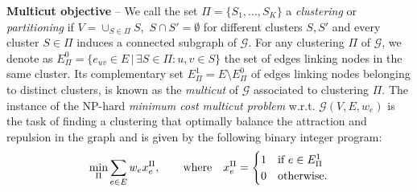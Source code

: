 \textbf{Multicut objective} -- We call the set $\Pi=\{S_1,\ldots,S_K\}$ a \emph{clustering} or \emph{partitioning} if $V = \cup_{S\in\Pi} S $, $\,S \cap S' = \emptyset$ for different clusters $S, S'$ and every cluster $S \in \Pi$ induces a connected subgraph of $\mathcal{G}$. 
For any clustering $\Pi$ of $\mathcal{G}$, we denote as $E^0_\Pi= \{ e_{uv} \in E \,|\, \exists S \in \Pi : u,v \in S \}$ the set of edges linking nodes in the same cluster. Its complementary set $E_\Pi^1= E \setminus E^0_\Pi$ of edges linking nodes belonging to distinct clusters, is known as the \emph{multicut} of $\mathcal{G}$ associated to clustering $\Pi$. The instance of the NP-hard \emph{minimum cost multicut problem} w.r.t. $\mathcal{G}(V,E,w_e)$ is the task of finding a clustering that optimally balance the attraction and repulsion in the graph and is given by the following binary integer program:
\begin{equation}\label{eq:MC_objective}
 \min_\Pi \sum_{e\in E} w_e x_e^\Pi,  \qquad \text{where} \quad x^\Pi_e = 
 \begin{cases} 
 1 & \text{if } e\in E^1_\Pi \\
 0 & \text{otherwise}.
 \end{cases}
\end{equation}


